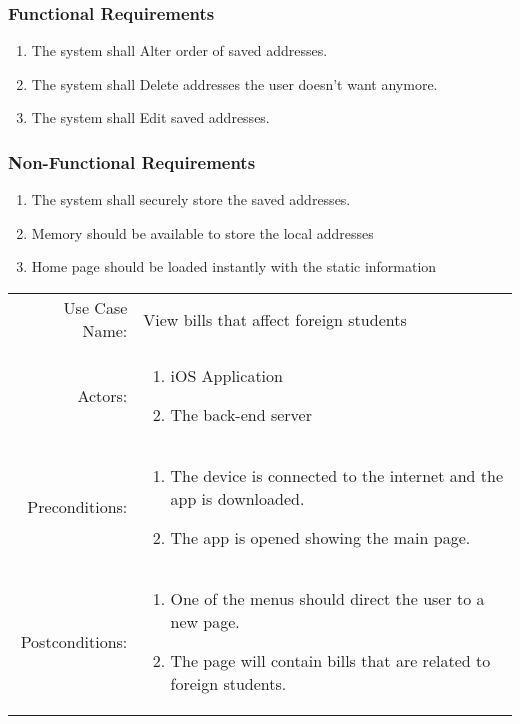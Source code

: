 \documentclass{beamer}
\newcommand{\requirement}[1]{The system shall #1.}
\begin{document}
\begin{frame}
  \frametitle{Functional Requirements}
  \begin{enumerate}
\item \requirement{Alter order of saved addresses}
\item \requirement{Delete addresses the user doesn't want anymore}
\item \requirement{Edit saved addresses}
  \end{enumerate}
\end{frame}

\begin{frame}
  \frametitle{Non-Functional Requirements}
  \begin{enumerate}
    \item \requirement{securely store the saved addresses}
    \item Memory should be available to store the local addresses
    \item Home page should be loaded instantly with the static information
  \end{enumerate}
\end{frame}

\begin{frame}
\begin{tabu}{rX}
  Use Case Name: & View bills that affect foreign students\\
Actors: & \begin{enumerate}\item iOS Application
    \item The back-end server
\end{enumerate} \\
  Preconditions: &
  \begin{enumerate}
    \item The device is connected to the internet and the app is downloaded.
    \item The app is opened showing the main page.
  \end{enumerate} \\
  Postconditions: &
  \begin{enumerate}
    \item One of the menus should direct the user to a new
      page.
    \item The page will contain bills that are related to foreign students.
  \end{enumerate} \\
\end{tabu}
\end{frame}
\end{document}
